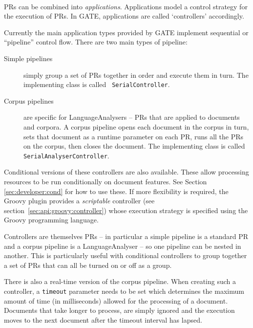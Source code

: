 
\mbox{ }

PRs can be combined into {\em applications}. Applications model a control
strategy for the execution of PRs. In GATE, applications are called
`controllers' accordingly.

Currently the main application types provided by GATE implement sequential or
``pipeline'' control flow. There are two main types of pipeline:
%
\begin{description}
%
\item[Simple pipelines] simply group a set of PRs together in order and
execute them in turn. The implementing class is called {\tt
SerialController}.
%
\item[Corpus pipelines] are specific for LanguageAnalysers -- PRs that are
applied to documents and corpora. A corpus pipeline opens each document in
the corpus in turn, sets that document as a runtime parameter on each PR,
runs all the PRs on the corpus, then closes the document.
The implementing class is called {\tt SerialAnalyserController}.
\end{description}

Conditional versions of these controllers are also available. These allow
processing resources to be run conditionally on document features. 
See Section \ref{sec:developer:cond} for how to use these.  If more flexibility
is required, the Groovy plugin provides a \emph{scriptable} controller (see
section~\ref{sec:api:groovy:controller}) whose execution strategy is specified
using the Groovy programming language.

Controllers are themselves PRs -- in particular a simple pipeline is a standard
PR and a corpus pipeline is a LanguageAnalyser -- so one pipeline can be nested
in another.  This is particularly useful with conditional controllers to group
together a set of PRs that can all be turned on or off as a group.

There is also a real-time version of the corpus pipeline. When creating such
a controller, a {\tt timeout} parameter needs to be set which determines the
maximum amount of time (in milliseconds) allowed for the processing of a
document. Documents that take longer to process, are simply ignored and the
execution moves to the next document after the timeout interval has lapsed.

